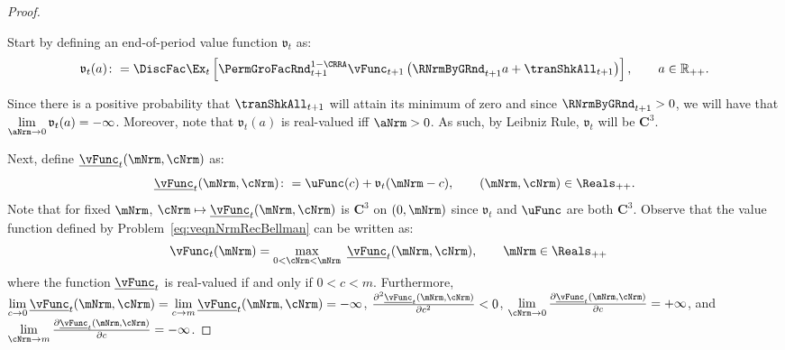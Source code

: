 \documentclass[\econtexRoot/BufferStockTheory]{subfiles}
\begin{document}
\begin{proof}

\hypertarget{BoroCnstNat}{}
%
Start by defining an end-of-period value function $\mathfrak{v}_{t}$ as:
%
\begin{equation}\label{eq:vfFrackdefn}
  \mathfrak{v}_{t}(a)\colon =\DiscFac \Ex_{t}\left[{\PermGroFacRnd}_{t+1}^{1-\CRRA}\vFunc_{t+1}\left({\RNrmByGRnd}_{t+1} a+{\tranShkAll}_{t+1}\right) \right], \qquad a\in \mathbb{R}_{++}. 
\end{equation}

Since there is a positive probability that $\tranShkAll_{t+1}$ will
attain its minimum of zero and since ${\RNrmByGRnd}_{t+1}>0$, we will have that $\lim\limits_{\aNrm \rightarrow 0} \mathfrak{v}_{t}(a) = -\infty$.
Moreover, note that
$\mathfrak{v}_{t}(a) $ is real-valued iff $\aNrm>0$.
As such, by Leibniz Rule,  $\mathfrak{v}_{t}$ will be $\mathbf{C}^{3}$.

Next, define $\underline{\vFunc}_{t}(\mNrm,\cNrm)$ as:
%
%
\begin{equation*}
  \underline{\vFunc}_{t}(\mNrm,\cNrm)\colon =\uFunc(c)+\mathfrak{v}_{t}(\mNrm-c), \qquad (\mNrm,\cNrm)\in \Reals_{++}.
\end{equation*}
%
Note that for fixed $\mNrm$, $\cNrm \mapsto \underline{\vFunc}_{t}(\mNrm,\cNrm)$ is $\mathbf{C}^{3}$ on $(0, \mNrm)$ since $\mathfrak{v}_{t}$ and $\uFunc$ are both
$\mathbf{C}^{3}$.
Observe that the value function defined
by Problem~\eqref{eq:veqnNrmRecBellman} can be written as:
%
\begin{equation*}\begin{gathered}\begin{aligned}
      \vFunc_{t}(\mNrm) & =  \max_{0<\cNrm<\mNrm}~\underline{\vFunc}_{t}(\mNrm,\cNrm), \qquad \mNrm\in \Reals_{++}
    \end{aligned}\end{gathered}\end{equation*}
%
where the function $\underline{\vFunc}_{t}$ is real-valued if and only if $0<c<m$.
Furthermore,
$\lim\limits_{c \rightarrow
  0}\underline{\vFunc}_{t}(\mNrm,\cNrm)=\lim\limits_{c\rightarrow m} \underline{\vFunc}_{t}(\mNrm,\cNrm)=-\infty $, $\frac{\partial ^{2}\underline{\vFunc}_{t}(\mNrm,\cNrm)}{\partial c^{2}}%
<0$, $\lim\limits_{\cNrm \rightarrow 0}\frac{\partial \underline{\vFunc}_{t}(\mNrm,\cNrm)}{\partial c}%
=+\infty $, and $\lim\limits_{\cNrm\rightarrow m} \frac{\partial \underline{\vFunc}_{t}(\mNrm,\cNrm)}{%
  \partial c}=-\infty $.


\end{proof}
\end{document}
